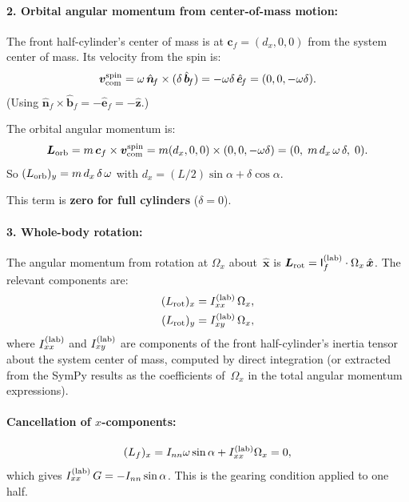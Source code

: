 \documentclass[11pt]{article}
\newcommand{\vect}[1]{\bm{#1}}
\newcommand{\uv}[1]{\hat{\bm{#1}}}
\newcommand{\xhat}{\uv{x}}
\newcommand{\zhat}{\uv{z}}
\newcommand{\nf}{\uv{n}_{\!f}}
\newcommand{\bfh}{\uv{b}_{\!f}}
\newcommand{\efh}{\uv{e}_{\!f}}
\begin{document}
\paragraph{2. Orbital angular momentum from center-of-mass motion:}
The front half-cylinder's center of mass is at $\vect{c}_f=(d_x,0,0)$
from the system center of mass.  Its velocity from the spin is:
\begin{equation}
\vect{v}_{\rm com}^{\rm spin}
= \omega\,\nf\times(\delta\,\bfh) = -\omega\delta\,\efh
= (0,0,-\omega\delta).
\end{equation}
(Using $\nf\times\bfh=-\efh=-\zhat$.)

The orbital angular momentum is:
\begin{equation}
\vect{L}_{\rm orb} = m\,\vect{c}_f\times\vect{v}_{\rm com}^{\rm spin}
= m(d_x,0,0)\times(0,0,-\omega\delta)
= (0,\;m\,d_x\,\omega\,\delta,\;0).
\end{equation}
So $(L_{\rm orb})_y=m\,d_x\,\delta\,\omega$ with
$d_x=(L/2)\sin\alpha+\delta\cos\alpha$.

This term is \textbf{zero for full cylinders} ($\delta=0$).

\paragraph{3. Whole-body rotation:}
The angular momentum from rotation at $\Omega_x$ about~$\xhat$ is
$\vect{L}_{\rm rot}=\mathsf{I}_f^{(\rm lab)}\cdot\Omega_x\,\xhat$.
The relevant components are:
\begin{align}
(L_{\rm rot})_x &= I_{xx}^{(\rm lab)}\,\Omega_x, \\
(L_{\rm rot})_y &= I_{xy}^{(\rm lab)}\,\Omega_x,
\end{align}
where $I_{xx}^{(\rm lab)}$ and $I_{xy}^{(\rm lab)}$ are components of
the front half-cylinder's inertia tensor about the system center of
mass, computed by direct integration (or extracted from the SymPy
results as the coefficients of~$\Omega_x$ in the total angular
momentum expressions).

\paragraph{Cancellation of $x$-components:}
\begin{equation}
(L_f)_x = I_{nn}\omega\sin\alpha + I_{xx}^{(\rm lab)}\Omega_x = 0,
\end{equation}
which gives $I_{xx}^{(\rm lab)}\,G = -I_{nn}\sin\alpha$.  This is
the gearing condition applied to one half.
\end{document}
